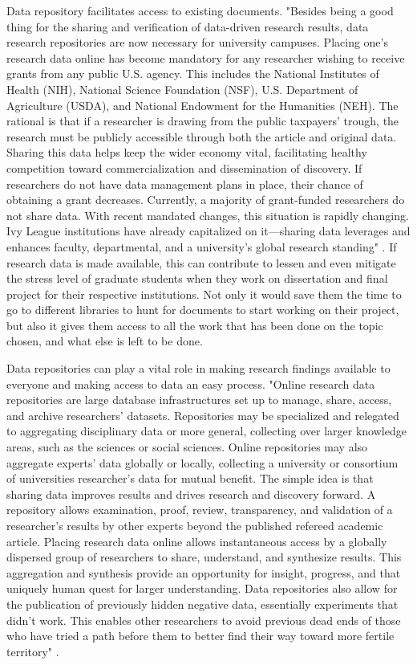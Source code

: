 \documentclass[sigconf]{acmart}
\begin{document}
Data repository facilitates access to existing documents. "Besides being a good thing for the sharing and verification of data-driven research results, data research repositories are now necessary for university campuses. Placing one’s research data online has become mandatory for any researcher wishing to receive grants from any public U.S. agency. This includes the National Institutes of Health (NIH), National Science Foundation (NSF), U.S. Department of Agriculture (USDA), and National Endowment for the Humanities (NEH). The rational is that if a researcher is drawing from the public taxpayers’ trough, the research must be publicly accessible through both the article and original data. Sharing this data helps keep the wider economy vital, facilitating healthy competition toward commercialization and dissemination of discovery. If researchers do not have data management plans in place, their chance of obtaining a grant decreases. Currently, a majority of grant-funded researchers do not share data. With recent mandated changes, this situation is rapidly changing. Ivy League institutions have already capitalized on it—sharing data leverages and enhances faculty, departmental, and a university’s global research standing" \cite{Uswyshyn2016}. If research data is made available, this can contribute to lessen and even mitigate the stress level of graduate students when they work on dissertation and final project for their respective institutions. Not only it would save them the time to go to different libraries to hunt for documents to start working on their project, but also it gives them access to all the work that has been done on the topic chosen, and what else is left to be done. 


Data repositories can play a vital role in making research findings available to everyone and making access to data an easy process. "Online research data repositories are large database infrastructures set up to manage, share, access, and archive researchers' datasets. Repositories may be specialized and relegated to aggregating disciplinary data or more general, collecting over larger knowledge areas, such as the sciences or social sciences. Online repositories may also aggregate experts' data globally or locally, collecting a university or consortium of universities researcher's data for mutual benefit. The simple idea is that sharing data improves results and drives research and discovery forward. A repository allows examination, proof, review, transparency, and validation of a researcher's results by other experts beyond the published refereed academic article. Placing research data online allows instantaneous access by a globally dispersed group of researchers to share, understand, and synthesize results. This aggregation and synthesis provide an opportunity for insight, progress, and that uniquely human quest for larger understanding. Data repositories also allow for the publication of previously hidden negative data, essentially experiments that didn't work. This enables other researchers to avoid previous dead ends of those who have tried a path before them to better find their way toward more fertile territory" \cite{Uswyshyn2016}. 
\end{document}
